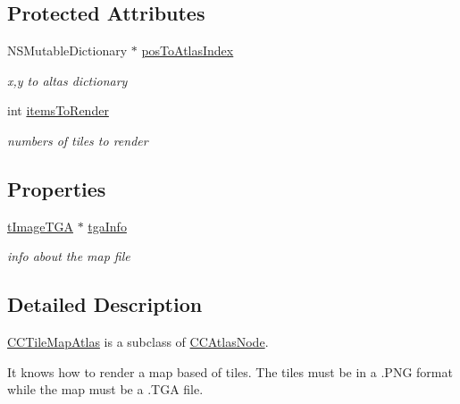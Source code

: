 \subsection*{Protected Attributes}
\begin{DoxyCompactItemize}
\item 
\hypertarget{interface_c_c_tile_map_atlas_a90bdb79daef7fbcdc26f3f9b190fb65c}{N\-S\-Mutable\-Dictionary $\ast$ \hyperlink{interface_c_c_tile_map_atlas_a90bdb79daef7fbcdc26f3f9b190fb65c}{pos\-To\-Atlas\-Index}}\label{interface_c_c_tile_map_atlas_a90bdb79daef7fbcdc26f3f9b190fb65c}

\begin{DoxyCompactList}\small\item\em x,y to altas dictionary \end{DoxyCompactList}\item 
\hypertarget{interface_c_c_tile_map_atlas_af8b798c035ee58c83f977507c91e48ac}{int \hyperlink{interface_c_c_tile_map_atlas_af8b798c035ee58c83f977507c91e48ac}{items\-To\-Render}}\label{interface_c_c_tile_map_atlas_af8b798c035ee58c83f977507c91e48ac}

\begin{DoxyCompactList}\small\item\em numbers of tiles to render \end{DoxyCompactList}\end{DoxyCompactItemize}
\subsection*{Properties}
\begin{DoxyCompactItemize}
\item 
\hyperlink{_t_g_alib_8h_a4806b57fade9f651148a380a8b3100ac}{t\-Image\-T\-G\-A} $\ast$ \hyperlink{interface_c_c_tile_map_atlas_aaeb4d528af3807a86bd3ea58f0ce27d0}{tga\-Info}
\begin{DoxyCompactList}\small\item\em info about the map file \end{DoxyCompactList}\end{DoxyCompactItemize}


\subsection{Detailed Description}
\hyperlink{interface_c_c_tile_map_atlas}{C\-C\-Tile\-Map\-Atlas} is a subclass of \hyperlink{interface_c_c_atlas_node}{C\-C\-Atlas\-Node}.

It knows how to render a map based of tiles. The tiles must be in a .P\-N\-G format while the map must be a .T\-G\-A file.

